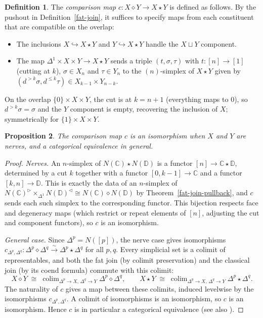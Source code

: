 \documentclass{article}
\newtheorem{proposition}{Proposition}
\theoremstyle{definition}
\newtheorem{definition}[proposition]{Definition}
\newcommand{\C}{\mathbb{C}}
\newcommand{\D}{\mathbb{D}}
\DeclareMathOperator{\colim}{colim}
\begin{document}
\begin{definition}\label{comparison-map}
	The \emph{comparison map} $c : X \diamond Y \to X \star Y$ is defined as follows. By the pushout in Definition~\ref{fat-join}, it suffices to specify maps from each constituent that are compatible on the overlap:
	\begin{itemize}
		\item The inclusions $X \hookrightarrow X \star Y$ and $Y \hookrightarrow X \star Y$ handle the $X \sqcup Y$ component.
		\item The map $\Delta^1 \times X \times Y \to X \star Y$ sends a triple $(t, \sigma, \tau)$ with $t : [n] \to [1]$ (cutting at $k$), $\sigma \in X_n$ and $\tau \in Y_n$ to the $(n)$-simplex of $X \star Y$ given by $(d^{>k}\sigma, d^{\leq k}\tau) \in X_{k-1} \times Y_{n-k}$.
	\end{itemize}
	On the overlap $\{0\} \times X \times Y$, the cut is at $k = n{+}1$ (everything maps to $0$), so $d^{>k}\sigma = \sigma$ and the $Y$ component is empty, recovering the inclusion of $X$; symmetrically for $\{1\} \times X \times Y$.
\end{definition}

\begin{proposition}\label{comparison}
	The comparison map $c$ is an isomorphism when $X$ and $Y$ are nerves, and a categorical equivalence in general.
\end{proposition}

\begin{proof}
	\emph{Nerves.} An $n$-simplex of $N(\C) \star N(\D)$ is a functor $[n] \to \C \star \D$, determined by a cut $k$ together with a functor $[0,k{-}1] \to \C$ and a functor $[k,n] \to \D$. This is exactly the data of an $n$-simplex of $N(\C)^\triangleright \times_{\Delta^1} N(\D)^\triangleleft \cong N(\C) \diamond N(\D)$ by Theorem~\ref{fat-join-pullback}, and $c$ sends each such simplex to the corresponding functor. This bijection respects face and degeneracy maps (which restrict or repeat elements of $[n]$, adjusting the cut and component functors), so $c$ is an isomorphism.

	\emph{General case.} Since $\Delta^p = N([p])$, the nerve case gives isomorphisms $c_{\Delta^p, \Delta^q} : \Delta^p \diamond \Delta^q \xrightarrow{\;\sim\;} \Delta^p \star \Delta^q$ for all $p,q$. Every simplicial set is a colimit of representables, and both the fat join (by colimit preservation) and the classical join (by its coend formula) commute with this colimit:
	\[X \diamond Y \;\cong\; \colim_{\Delta^p \to X,\, \Delta^q \to Y} \Delta^p \diamond \Delta^q, \qquad X \star Y \;\cong\; \colim_{\Delta^p \to X,\, \Delta^q \to Y} \Delta^p \star \Delta^q.\]
	The naturality of $c$ gives a map between these colimits, induced levelwise by the isomorphisms $c_{\Delta^p,\Delta^q}$. A colimit of isomorphisms is an isomorphism, so $c$ is an isomorphism. Hence $c$ is in particular a categorical equivalence (see also \cite[Proposition 4.3.3.24]{Kerodon}).
\end{proof}
\end{document}
